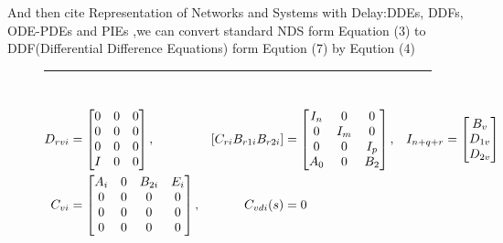 \documentclass[twocolumn]{autart}    %
\begin{document}
And then cite Representation of Networks and Systems with Delay:DDEs, DDFs, ODE-PDEs and PIEs ,we can convert standard NDS form Equation (3) to DDF(Differential Difference Equations) form Eqution (7) by Eqution (4)


\begin{figure*}[hb] %
    \flushleft
    {\noindent}	 \rule[-10pt]{17.5cm}{0.05em}\\
    \vspace{1.5em}
    \begin{equation}
        \begin{aligned}
            D_{rvi} &= 
            \begin{bmatrix}
                0 & 0 & 0 \\
                0 & 0 & 0 \\
                0 & 0 & 0 \\
                I & 0 & 0
            \end{bmatrix}       ,    & [C_{ri} \space B_{r1i} \space B_{r2i}] &= 
                                        \begin{bmatrix}
                                            I_{n} & 0 & 0 \\
                                            0 & I_{m} & 0 \\
                                            0 & 0 & I_{p} \\
                                            A_{0} & 0 & B_{2}
                                            \end{bmatrix}  ,                           & I_{n+q+r}&= 
                                                                                        \begin{bmatrix}
                                                                                            B_{v} \\
                                                                                            D_{1v} \\
                                                                                            D_{2v} 
                                                                                        \end{bmatrix}\ \\
            C_{vi} &= 
            \begin{bmatrix}
                A_{i} & 0 & B_{2i} & E_{i} \\
                0 & 0 & 0 & 0\\
                0 & 0 & 0 & 0\\
                0 & 0 & 0 & 0
            \end{bmatrix}  ,              & C_{vdi}(s) &= 0 
        \end{aligned}
    \end{equation}
\end{figure*}
\end{document}
